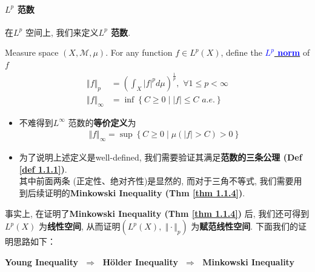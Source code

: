 \paragraph{$L^p$ 范数}
	在$L^{p}$ 空间上, 我们来定义\textbf{$L^p$ 范数}.
	\begin{defn}\label{def 1.1.4}
		Measure space $(X , \mathcal{M} , \mu)$. For any function $f \in L^{p}(X)$, define the \underline{\textcolor{blue}{\textbf{$L^p$ norm}}} of $f$
		\begin{align}
			\Vert f \Vert_{p} &= \left( \int_{X}{\left| f \right|^p d\mu} \right)^{\frac{1}{p}} , \,\, \forall 1 \leq p < \infty \\
			\Vert f \Vert_\infty &= \inf{\left\{ C \geq 0 \mid \left| f \right| \leq C \,\, a.e. \right\}}
		\end{align}
		
		\vspace{2em}
		\begin{rmk}
			\begin{itemize}
				\item 不难得到$L^\infty$ 范数的\textbf{等价定义}为
				\begin{align}
					\Vert f \Vert_\infty = \sup{\left\{ C \geq 0 \mid \mu(\left| f \right| > C ) > 0 \right\}}
				\end{align}
			
				\vspace{1em}
				
				\item 为了说明上述定义是well-defined, 我们需要验证其满足\textbf{范数的三条公理 (Def \ref{def 1.1.1})}. \\
				其中前面两条 (正定性、绝对齐性)是显然的, 而对于三角不等式, 我们需要用到后续证明的\textbf{Minkowski Inequality (Thm \ref{thm 1.1.4})}.
			\end{itemize}
		\end{rmk}
	\end{defn}
	
	\vspace{4em}
	事实上, 在证明了\textbf{Minkowski Inequality (Thm \ref{thm 1.1.4})} 后, 我们还可得到$L^{p}(X)$ 为\textbf{线性空间}, 从而证明$(L^{p}(X) , \,\, \Vert \cdot \Vert_p)$ 为\textbf{赋范线性空间}. 下面我们的证明思路如下：
	\begin{center}
		\textbf{Young Inequality} $\,\, \Rightarrow \,\,$ \textbf{H\"{o}lder Inequality} $\,\, \Rightarrow \,\,$ \textbf{Minkowski Inequality}
	\end{center}

\newpage
